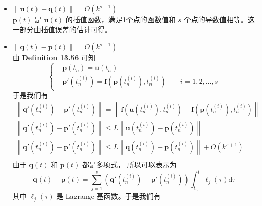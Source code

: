 \documentclass[a4paper]{article}
\begin{document}
\begin{itemize}
    \item $\left\|\mathbf{u}(t) - \mathbf{q}(t)\right\| = O(k^{s+1})$\\
    $\mathbf{p}(t)$ 是 $\mathbf{u}(t)$ 的插值函数，满足1个点的函数值和
    $s$ 个点的导数值相等。这一部分由插值误差的估计可得。
    \item $\left\|\mathbf{q}(t) - \mathbf{p}(t)\right\| = O(k^{s+1})$\\
    由 \textbf{Definition 13.56} 可知
    \begin{equation}
        \left\{
            \begin{aligned}
                &\mathbf{p}(t_n) = \mathbf{u}(t_n)\\
                &\mathbf{p}'(t_n^{(i)}) = \mathbf{f}\left(
                    \mathbf{p}(t_n^{(i)}),t_n^{(i)}
                \right)
                \qquad i = 1,2,\ldots,s
            \end{aligned}
        \right.
    \end{equation}
    于是我们有
    \begin{equation}
        \begin{gathered}
            \left\|\mathbf{q}'(t_n^{(i)}) - \mathbf{p}'(t_n^{(i)})\right\|
            = \left\|\mathbf{f}\left(
                \mathbf{u}(t_n^{(i)}),t_n^{(i)}
            \right) - \mathbf{f}\left(
                \mathbf{p}(t_n^{(i)}),t_n^{(i)}
            \right)\right\|\\
            \left\|\mathbf{q}'(t_n^{(i)}) - \mathbf{p}'(t_n^{(i)})\right\|
            \leq L\left\|
                \mathbf{u}(t_n^{(i)}) - \mathbf{p}(t_n^{(i)})
            \right\|\\
            \left\|\mathbf{q}'(t_n^{(i)}) - \mathbf{p}'(t_n^{(i)})\right\|
            \leq L\left\|
                \mathbf{q}(t_n^{(i)}) - \mathbf{p}(t_n^{(i)})
            \right\| + O(k^{s+1})\\
        \end{gathered}
    \end{equation}
    由于 $\mathbf{q}(t)$ 和 $\mathbf{p}(t)$ 都是多项式，
    所以可以表示为
    \begin{equation}
        \mathbf{q}(t) - \mathbf{p}(t) 
        = \sum_{j=1}^{s} \left(
            \mathbf{q}'(t_n^{(i)}) - \mathbf{p}'(t_n^{(i)})
        \right)\int_{t_n}^{t} \ell_j(\tau) \text{d}\tau
    \end{equation}
    其中 $\ell_j(\tau)$ 是 Lagrange 基函数。于是我们有
    \begin{equation}

\end{equation}
\end{itemize}
\end{document}
